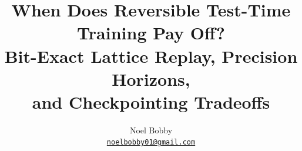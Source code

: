 \documentclass[10pt,letterpaper]{article}
\title{When Does Reversible Test-Time Training Pay Off?\\
Bit-Exact Lattice Replay, Precision Horizons,\\
and Checkpointing Tradeoffs}
\author{Noel Bobby\\
  \small\href{mailto:noelbobby01@gmail.com}{\texttt{noelbobby01@gmail.com}}\\
  \small\RepoLink}
\date{}
\begin{document}
\maketitle









\appendix



\begingroup
\raggedright

\endgroup
\end{document}
